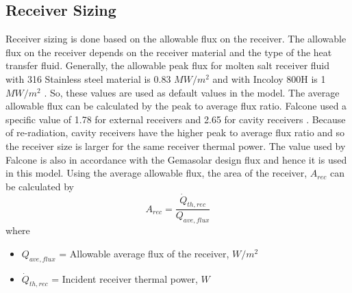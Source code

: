 \subsection{Receiver Sizing}
Receiver sizing is done based on the allowable flux on the receiver. The allowable flux on the receiver depends on the receiver material and the type of the heat transfer fluid. Generally, the allowable peak flux for molten salt receiver fluid with 316 Stainless steel material is 0.83 $MW/m^2$ \cite{Falcone.1986} and with Incoloy 800H is 1 $MW/m^2$ \cite{Liao.2014} \cite{Zavoico.2001}. So, these values are used as default values in the model. The average allowable flux can be calculated by the peak to average flux ratio. Falcone used a specific value of 1.78 for external receivers and 2.65 for cavity receivers \cite{Falcone.1986}. Because of re-radiation, cavity receivers have the higher peak to average flux ratio and so the receiver size is larger for the same receiver thermal power. The value used by Falcone is also in accordance with the Gemasolar design flux and hence it is used in this model. Using the average allowable flux, the area of the receiver, $A_{rec}$ can be calculated by 
\begin{equation}
	A_{rec} = \frac {\dot Q_{th,rec}} {Q_{ave,flux}}
\end{equation}
where 
\begin{itemize}
	\item $Q_{ave,flux}$ = Allowable average flux of the receiver, $W/m^2$
	\item $\dot Q_{th,rec}$ = Incident receiver thermal power, $W$
\end{itemize}
